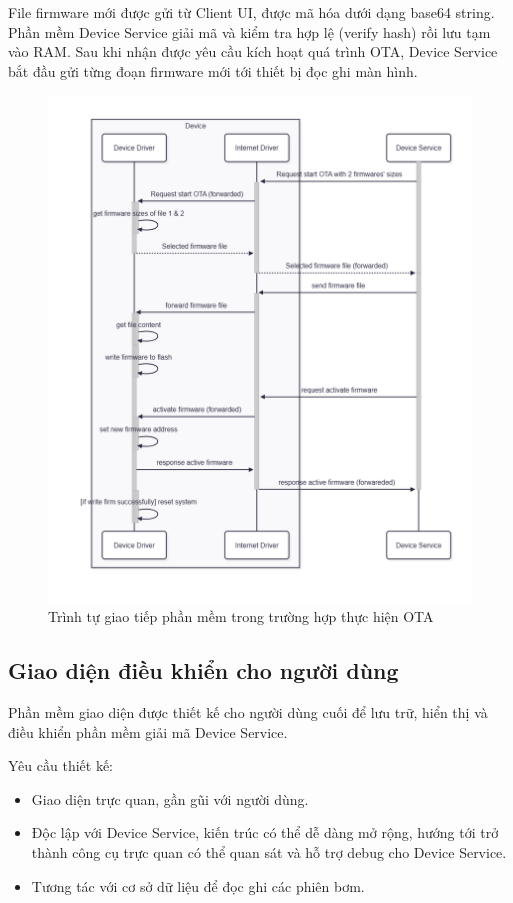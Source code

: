 File firmware mới được gửi từ Client UI, được mã hóa dưới dạng base64 string. Phần mềm Device Service giải mã và kiểm tra hợp lệ (verify hash) rồi lưu tạm vào RAM. Sau khi nhận được yêu cầu kích hoạt quá trình OTA, Device Service bắt đầu gửi từng đoạn firmware mới tới thiết bị đọc ghi màn hình.

\begin{figure}[!ht]
     \centering
    \includegraphics[width=0.8\linewidth]{Figures/Chap3_Device-firm-implementation-ota.png}
    \caption{Trình tự giao tiếp phần mềm trong trường hợp thực hiện OTA}
    \label{fig:Chap3_Device-firm-implementation-ota}
\end{figure}

\FloatBarrier

\subsection{Giao diện điều khiển cho người dùng}

\hspace{0.8cm} Phần mềm giao diện được thiết kế cho người dùng cuối để lưu trữ, hiển thị và điều khiển phần mềm giải mã Device Service.

Yêu cầu thiết kế:

\begin{itemize}
    \item Giao diện trực quan, gần gũi với người dùng.
    \item Độc lập với Device Service, kiến trúc có thể dễ dàng mở rộng, hướng tới trở thành công cụ trực quan có thể quan sát và hỗ trợ debug cho Device Service.
    \item Tương tác với cơ sở dữ liệu để đọc ghi các phiên bơm.
\end{itemize}

